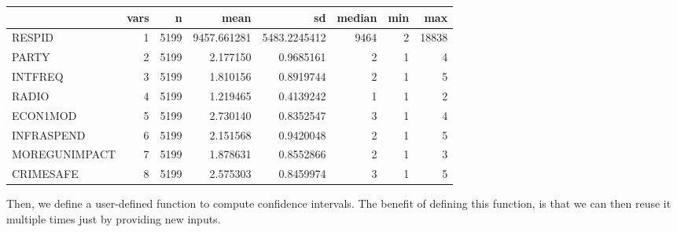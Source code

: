 \documentclass[
  11pt,
]{article}
\begin{document}
\begin{tabular}{l|r|r|r|r|r|r|r}
\hline
  & vars & n & mean & sd & median & min & max\\
\hline
RESPID & 1 & 5199 & 9457.661281 & 5483.2245412 & 9464 & 2 & 18838\\
\hline
PARTY & 2 & 5199 & 2.177150 & 0.9685161 & 2 & 1 & 4\\
\hline
INTFREQ & 3 & 5199 & 1.810156 & 0.8919744 & 2 & 1 & 5\\
\hline
RADIO & 4 & 5199 & 1.219465 & 0.4139242 & 1 & 1 & 2\\
\hline
ECON1MOD & 5 & 5199 & 2.730140 & 0.8352547 & 3 & 1 & 4\\
\hline
INFRASPEND & 6 & 5199 & 2.151568 & 0.9420048 & 2 & 1 & 5\\
\hline
MOREGUNIMPACT & 7 & 5199 & 1.878631 & 0.8552866 & 2 & 1 & 3\\
\hline
CRIMESAFE & 8 & 5199 & 2.575303 & 0.8459974 & 3 & 1 & 5\\
\hline
\end{tabular}

Then, we define a user-defined function to compute confidence intervals.
The benefit of defining this function, is that we can then reuse it
multiple times just by providing new inputs.
\end{document}

